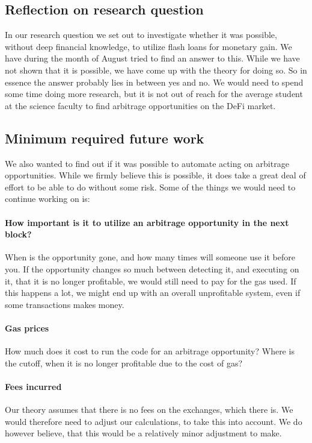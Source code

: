 \subsection{Reflection on research question}
In our research question we set out to investigate whether it was possible,
without deep financial knowledge, to utilize flash loans for monetary gain. We
have during the month of August tried to find an answer to this. While we have
not shown that it is possible, we have come up with the theory for doing so. So
in essence the answer probably lies in between yes and no. We would need to
spend some time doing more research, but it is not out of reach for the average
student at the science faculty to find arbitrage opportunities on the DeFi
market.

\subsection{Minimum required future work}
\noindent We also wanted to find out if it was possible to automate acting on
arbitrage opportunities. While we firmly believe this is possible, it does take
a great deal of effort to be able to do without some risk. Some of the things
we would need to continue working on is:

\paragraph{How important is it to utilize an arbitrage opportunity in the next
block?} When is the opportunity gone, and how many times will someone use it
before you. If the opportunity changes so much between detecting it, and
executing on it, that it is no longer profitable, we would still need to pay for
the gas used. If this happens a lot, we might end up with an overall
unprofitable system, even if some transactions makes money.
\paragraph{Gas prices} How much does it cost to run the code for an arbitrage
opportunity? Where is the cutoff, when it is no longer profitable due to the
cost of gas?
\paragraph{Fees incurred} Our theory assumes that there is no fees on the
exchanges, which there is. We would therefore need to adjust our calculations,
to take this into account. We do however believe, that this would be a
relatively minor adjustment to make.
